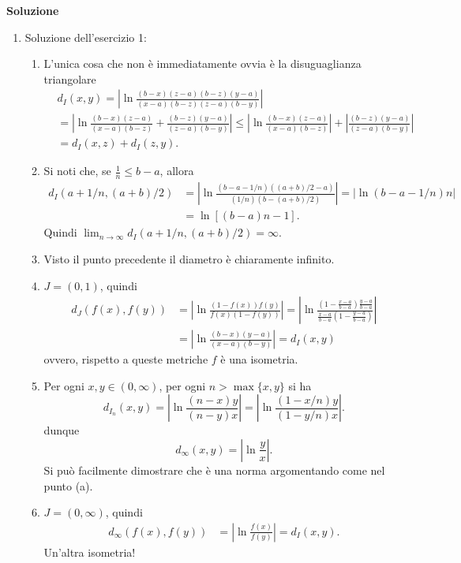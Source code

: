 \documentclass{report}
\begin{document}
\centerline{\huge\bf Soluzione}
\begin{enumerate}
\item Soluzione dell'esercizio 1:
\begin{enumerate}
\item L'unica cosa che non è immediatamente ovvia è la disuguaglianza triangolare
\[
\begin{split}
&d_I(x,y)=\left|\ln\frac{ (b-x)(z-a)(b-z)(y-a)}{(x-a)(b-z)(z-a)(b-y)}\right|\\
&=\left|\ln\frac{ (b-x)(z-a)}{(x-a)(b-z)}+\frac{(b-z)(y-a)}{(z-a)(b-y)}\right|
\leq \left|\ln\frac{ (b-x)(z-a)}{(x-a)(b-z)}\right|+\left|\frac{(b-z)(y-a)}{(z-a)(b-y)}\right|\\
&=d_I(x,z)+d_I(z,y).
\end{split}
\]
\item Si noti che, se  $\frac 1n\leq b-a$, allora
\[
\begin{split}
d_I(a+1/n, (a+b)/2)&=\left|\ln\frac{ (b-a-1/n)((a+b)/2-a)}{(1/n)(b-(a+b)/2)}\right|
=\left|\ln (b-a-1/n)n\right|\\
&=\ln [(b-a)n-1].
\end{split}
\]
Quindi $\lim_{n\to\infty}d_I(a+1/n, (a+b)/2)=\infty$.
\item Visto il punto precedente il diametro è chiaramente infinito.
\item $J=(0,1)$, quindi
\[
\begin{split}
d_J(f(x),f(y))&=\left|\ln\frac{ (1-f(x))f(y)}{f(x)(1-f(y))}\right|=
\left|\ln\frac{ (1-\frac{x-a}{b-a})\frac{y-a}{b-a}}{\frac{x-a}{b-a}(1-\frac{y-a}{b-a})}\right|\\
&=\left|\ln\frac{ (b-x)(y-a)}{(x-a)(b-y)}\right|=d_I(x,y)
\end{split}
\]
ovvero, rispetto a queste metriche $f$ è una isometria.
\item Per ogni $x,y\in(0,\infty)$, per ogni $n>\max\{x,y\}$ si ha
\[
d_{I_n}(x,y)=\left|\ln\frac{ (n-x)y}{(n-y)x}\right|=\left|\ln\frac{ (1-x/n)y}{(1-y/n)x}\right|.
\]
dunque
\[
d_\infty(x,y)=\left|\ln\frac{y}{x}\right|.
\]
Si può facilmente dimostrare che è una norma argomentando come nel punto (a).
\item $J=(0,\infty)$, quindi
\[
\begin{split}
d_\infty(f(x),f(y))&=\left|\ln\frac{ f(x)}{f(y)}\right|=d_I(x,y).
\end{split}
\]
Un'altra isometria!
\end{enumerate}
\end{enumerate}
\end{document}
